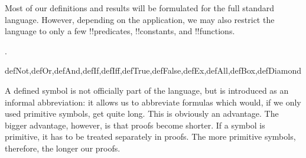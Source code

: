 \documentclass[../../../include/open-logic-section]{subfiles}
\begin{document}
Most of our definitions and results will be formulated for the full
standard language. However, depending on the
application, we may also restrict the language to only a few
!!{predicate}s, !!{constant}s, and !!{function}s.

%
  .

\begin{tagblock}{defNot,defOr,defAnd,defIf,defIff,defTrue,defFalse,defEx,defAll,defBox,defDiamond}
\begin{explain}
A defined symbol is not officially part of the language, but is
introduced as an informal abbreviation: it allows us to abbreviate
formulas which would, if we only used primitive symbols, get quite
long.  This is obviously an advantage.  The bigger advantage, however,
is that proofs become shorter.  If a symbol is primitive, it has to be
treated separately in proofs. The more primitive symbols, therefore,
the longer our proofs.
\end{explain}
\end{tagblock}
\end{document}

